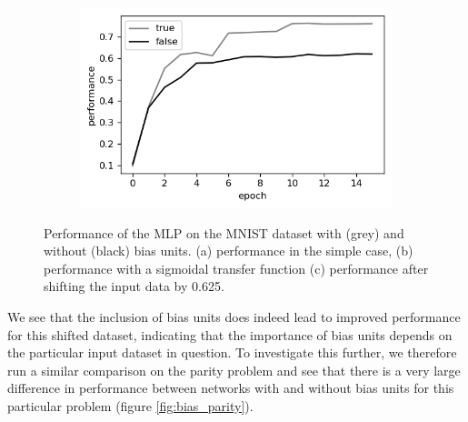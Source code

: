 \documentclass{article}
\begin{document}
\begin{figure}[h]
\begin{subfigure}[t]{0.32\linewidth}
		\includegraphics[width = 1.0\linewidth, trim={5 5 5 5}, clip=true]{figures/test_bias_shift725.png}
		\subcaption{}	
		\label{fig:biasshifted}
	\end{subfigure}%
\caption{Performance of the MLP on the MNIST dataset with (grey) and without (black) bias units. (a) performance in the simple case, (b)  performance with a sigmoidal transfer function (c) performance after shifting the input data by 0.625.}
\label{fig:biasunits_tanh}
\end{figure}

\newpage


We see that the inclusion of bias units does indeed lead to improved performance for this shifted dataset, indicating that the importance of bias units depends on the particular input dataset in question. To investigate this further, we therefore run a similar comparison on the parity problem and see that there is a very large difference in performance between networks with and without bias units for this particular problem (figure \ref{fig:bias_parity}).
\end{document}
